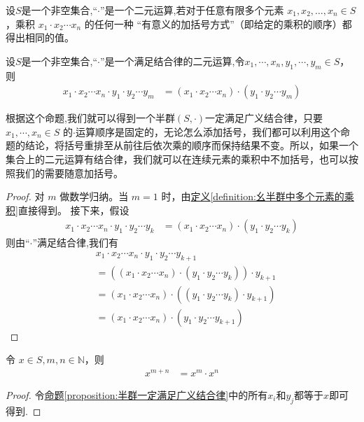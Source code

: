 \documentclass[../../main.tex]{subfiles}
\begin{document}
\begin{definition}[广义结合律]
设$S$是一个非空集合,“$\cdot$”是一个二元运算,若对于任意有限多个元素 $x_1, x_2, \dots, x_n \in S$，乘积 $x_1\cdot x_2 \cdots x_n$ 的任何一种 “有意义的加括号方式”（即给定的乘积的顺序）都得出相同的值。 
\end{definition}

\begin{proposition}\label{proposition:半群一定满足广义结合律}
设$S$是一个非空集合,“$\cdot$”是一个满足结合律的二元运算,令$x_1, \cdots, x_n, y_1, \cdots, y_m \in S$，则
\begin{align*}
x_1 \cdot x_2 \cdots x_n \cdot y_1 \cdot y_2 \cdots y_m &= (x_1 \cdot x_2 \cdots x_n) \cdot (y_1 \cdot y_2 \cdots y_m) \tag{1.6}
\end{align*}
\end{proposition}
\begin{note}
根据这个命题,我们就可以得到一个半群$(S,\cdot)$一定满足广义结合律，只要 $x_1, \cdots, x_n\in S$ 的$\cdot$运算顺序是固定的，无论怎么添加括号，我们都可以利用这个命题的结论，将括号重排至从前往后依次乘的顺序而保持结果不变。所以，如果一个集合上的二元运算有结合律，我们就可以在连续元素的乘积中不加括号，也可以按照我们的需要随意加括号。
\end{note}
\begin{proof}
对 $m$ 做数学归纳。当 $m = 1$ 时，由\hyperref[definition:幺半群中多个元素的乘积]{定义\ref{definition:幺半群中多个元素的乘积}}直接得到。
接下来，假设
\begin{align*}
x_1 \cdot x_2 \cdots x_n \cdot y_1 \cdot y_2 \cdots y_k &= (x_1 \cdot x_2 \cdots x_n) \cdot (y_1 \cdot y_2 \cdots y_k)
\end{align*}
则由“$\cdot$”满足结合律,我们有
\begin{align*}
&x_1 \cdot x_2 \cdots x_n \cdot y_1 \cdot y_2 \cdots y_{k + 1} \\
&= ((x_1 \cdot x_2 \cdots x_n) \cdot (y_1 \cdot y_2 \cdots y_k)) \cdot y_{k + 1} \\
&= (x_1 \cdot x_2 \cdots x_n) \cdot ((y_1 \cdot y_2 \cdots y_k) \cdot y_{k + 1}) \\
&= (x_1 \cdot x_2 \cdots x_n) \cdot (y_1 \cdot y_2 \cdots y_{k + 1}) 
\end{align*}
\end{proof}

\begin{corollary}\label{corollary:满足结合律一定满足广义结合律的推论}
令 $x \in S, m, n \in \mathbb{N}$，则
\begin{align*}
x^{m + n} &= x^m \cdot x^n
\end{align*} 
\end{corollary}
\begin{proof}
令\hyperref[proposition:半群一定满足广义结合律]{命题\ref{proposition:半群一定满足广义结合律}}中的所有$x_i$和$y_j$都等于$x$即可得到.
\end{proof}
\end{document}

